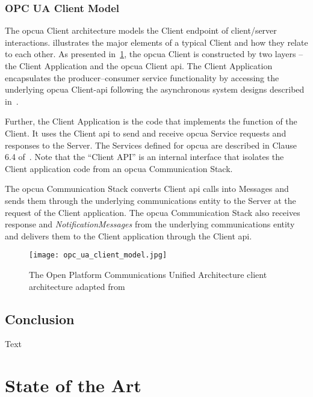 \documentclass[
a4paper,
twoside,
headsepline,
cleardoublepage=empty,
parskip=half,
draft=false
]{scrbook}
\begin{document}
			\subsection{OPC UA Client Model}\label{subsec:opc_ua_client_model}

				The \gls{opcua} Client architecture models the Client endpoint of client/server interactions.
				 illustrates the major elements of a typical Client and how they relate to each other.
				As presented in~\cref{fig:opc_ua_client_model}, the \gls{opcua} Client is constructed by two layers -- the Client Application and the \gls{opcua} Client \gls{api}. The Client Application encapsulates the producer–consumer service functionality by accessing the underlying \gls{opcua} Client-\gls{api} following the asynchronous system designs described in~\cite{tanenbaum2007distributed}.
				
				Further, the Client Application is the code that implements the function of the Client.
				It uses the Client \gls{api} to send and receive \gls{opcua} Service requests and responses to the Server.
				The Services defined for \gls{opcua} are described in Clause 6.4 of~\cite{opcfoundation2017part4}.
				Note that the ``Client API'' is an internal interface that isolates the Client application code from an \gls{opcua} Communication Stack.
				
				The \gls{opcua} Communication Stack converts Client \gls{api} calls into Messages and sends them through the underlying communications entity to the Server at the request of the Client application.
				The \gls{opcua} Communication Stack also receives response and \textit{NotificationMessages} from the underlying communications entity and delivers them to the Client application through the Client \gls{api}.

				\begin{figure}[H]
					\centering
					\texttt{[image: opc\_ua\_client\_model.jpg]}
					\caption{The Open Platform Communications Unified Architecture client architecture adapted from~\cite{opcfoundation2017part1}}
					\label{fig:opc_ua_client_model}
				\end{figure}
			
		\section*{Conclusion}\label{sec:foundations_conclusion}
		
			Text

	\chapter{State of the Art}\label{ch:state_of_the_art}
	
\end{document}
